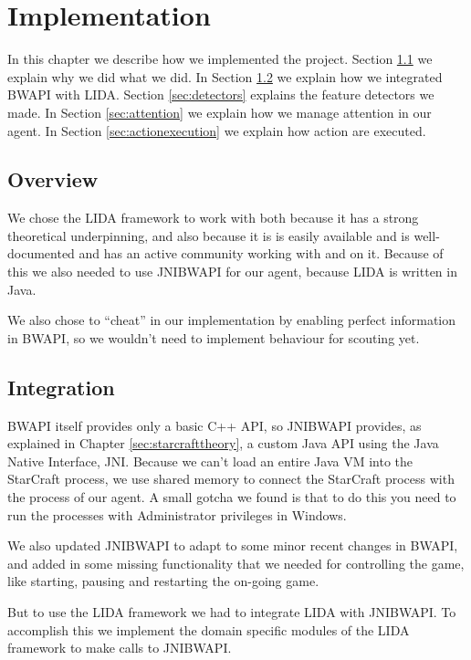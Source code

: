 
\chapter{Implementation}
In this chapter we describe how we implemented the project.
Section \ref{sec:overview} we explain why we did what we did.
In Section \ref{sec:integration} we explain how we integrated BWAPI with LIDA.
Section \ref{sec:detectors} explains the feature detectors we made.
In Section \ref{sec:attention} we explain how we manage attention in our agent.
In Section \ref{sec:actionexecution} we explain how action are executed.

\section{Overview}
\label{sec:overview}
We chose the LIDA framework to work with both because it has a strong theoretical underpinning, and also because it is is easily available and is well-documented and has an active community working with and on it. Because of this we also needed to use JNIBWAPI for our agent, because LIDA is written in Java.

We also chose to ``cheat'' in our implementation by enabling perfect information in BWAPI, so we wouldn't need to implement behaviour for scouting yet.

\section{Integration}
\label{sec:integration}
BWAPI itself provides only a basic C++ API, so JNIBWAPI provides, as explained in Chapter \ref{sec:starcrafttheory}, a custom Java API using the Java Native Interface, JNI.\cite{jni} Because we can't load an entire Java VM into the StarCraft process, we use shared memory to connect the StarCraft process with the process of our agent. A small gotcha we found is that to do this you need to run the processes with Administrator privileges in Windows.

We also updated JNIBWAPI to adapt to some minor recent changes in BWAPI, and added in some missing functionality that we needed for controlling the game, like starting, pausing and restarting the on-going game.

But to use the LIDA framework we had to integrate LIDA with JNIBWAPI. To accomplish this we implement the domain specific modules of the LIDA framework to make calls to JNIBWAPI.

